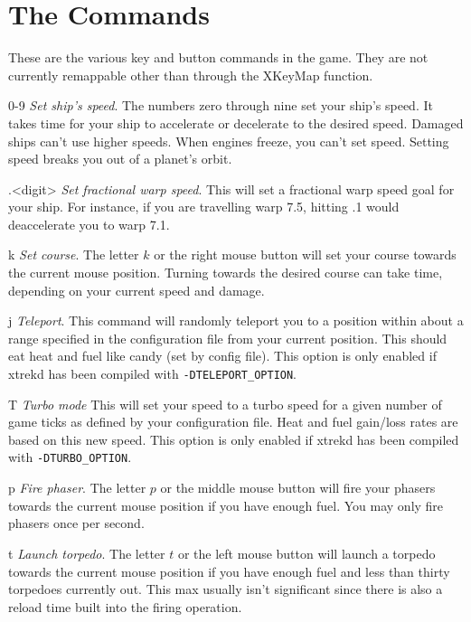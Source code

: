 \section{The Commands}
These are the various key and button commands in the game.
They are not currently remappable other than through the XKeyMap
function.

\begin{list}{}{
	\renewcommand{\makelabel}[1]{{\tt #1 \hfill}}
         \setlength{\leftmargin}{.5in}
         \setlength{\labelwidth}{\leftmargin}
         \setlength{\labelsep}{0in}
}
\item[0-9]{\em  Set ship's speed}.
The numbers zero through nine set your ship's speed.  It takes time for
your ship to accelerate or decelerate to the desired speed.  Damaged
ships can't use higher speeds.  When engines freeze, you can't set
speed.  Setting speed breaks you out of a planet's orbit.

\item[.<digit>]{\em Set fractional warp speed}.
This will set a fractional warp speed goal for your ship. For instance, if
you are travelling warp 7.5, hitting .1 would deaccelerate you to warp 7.1.

\item[k]{\em Set course}.
The letter $k$ or the right mouse button will set your course towards
the current mouse position.  Turning towards the desired course can
take time, depending on your current speed and damage.

\item[j]{\em Teleport}.
This command will randomly teleport you to a position within about a 
range specified in the configuration file from your current position. 
This should eat heat and fuel like candy (set
by config file). This option is only enabled if xtrekd has been compiled
with \verb|-DTELEPORT_OPTION|.

\item[T]{\em Turbo mode}
This will set your speed to a turbo speed for a given number of game ticks 
as defined by your configuration file. Heat and fuel gain/loss rates are
based on this new speed. This option is only enabled if xtrekd has been 
compiled with \verb|-DTURBO_OPTION|.

\item[p]{\em Fire phaser}.
The letter $p$ or the middle mouse button will fire your phasers
towards the current mouse position if you have enough fuel.  You may
only fire phasers once per second.

\item[t]{\em Launch torpedo}.
The letter $t$ or the left mouse button will launch a torpedo towards
the current mouse position if you have enough fuel and less than thirty
torpedoes currently out. This max usually isn't significant since there
is also a reload time built into the firing operation.


\end{list}
